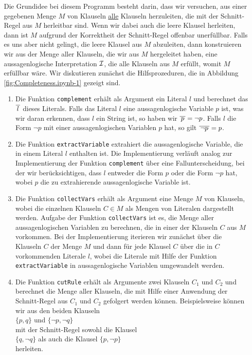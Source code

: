 Die Grundidee
bei diesem Programm besteht darin, dass wir versuchen, aus einer gegebenen Menge $M$ von Klauseln
\underline{alle} Klauseln herzuleiten, die mit der Schnitt-Regel aus $M$ herleitbar sind.  Wenn wir dabei auch
die leere Klausel herleiten, dann ist $M$ aufgrund der Korrektheit der Schnitt-Regel offenbar
unerfüllbar.  Falls es uns aber nicht gelingt, die leere Klausel aus $M$ abzuleiten, dann konstruieren wir
aus der Menge aller Klauseln, die wir aus $M$ hergeleitet haben, eine aussagenlogische Interpretation
$\mathcal{I}$, die alle Klauseln aus $M$ erfüllt, womit $M$ erfüllbar wäre.
Wir diskutieren zunächst die Hilfsprozeduren, die in Abbildung \ref{fig:Completeness.ipynb-1} gezeigt
sind. 
\begin{enumerate}
\item Die Funktion \texttt{complement} erhält als Argument ein Literal $l$ und berechnet das
       $\overline{\,l\,}$ dieses Literals.
      Falls das Literal $l$ eine aussagenlogische Variable $p$ ist, was wir daran erkennen, dass $l$ ein String
      ist, so haben wir $\overline{\,p\,} = \neg p$.
      Falls $l$ die Form $\neg p$ mit einer aussagenlogischen Variablen $p$ hat, so gilt $\overline{\,\neg p\,} =
      p$.
\item Die Funktion \texttt{extractVariable} extrahiert die aussagenlogische Variable, die in einem Literal $l$
      enthalten ist.  Die Implementierung verläuft analog zur Implementierung der Funktion
      \texttt{complement} über eine Fallunterscheidung, bei der wir berücksichtigen, dass $l$ entweder die Form
      $p$ oder die Form $\neg p$ hat, wobei $p$ die zu extrahierende aussagenlogische Variable ist.
\item Die Funktion \texttt{collectVars} erhält als Argument eine Menge $M$ von Klauseln, wobei die
      einzelnen Klauseln  \mbox{$C \!\in\! M$} als Mengen von Literalen dargestellt werden.  Aufgabe der
      Funktion \texttt{collectVars} ist es, die Menge aller aussagenlogischen Variablen zu
      berechnen, die in einer der Klauseln $C$ aus $M$ vorkommen.  Bei der Implementierung iterieren
      wir zunächst über die Klauseln $C$ der Menge $M$ und dann für jede Klausel $C$ über die in $C$
      vorkommenden Literale $l$, wobei die Literale mit Hilfe der Funktion \texttt{extractVariable} in
      aussagenlogische Variablen umgewandelt werden.
\item Die Funktion \texttt{cutRule} erhält als Argumente zwei Klauseln $C_1$ und $C_2$ und berechnet
      die Menge aller Klauseln, die mit Hilfe einer Anwendung der Schnitt-Regel aus $C_1$ und $C_2$ gefolgert werden
      können.  Beispielsweise können wir aus den beiden Klauseln
      \\[0.2cm]
      \hspace*{1.3cm}
      $\{ p, q \}$ \quad und \quad $\{ \neg p, \neg q \}$ 
      \\[0.2cm]
      mit der Schnitt-Regel sowohl die Klausel
      \\[0.2cm]
      \hspace*{1.3cm}
      $\{q, \neg q\}$ \quad als auch die Klausel \quad $\{p, \neg p \}$
      \\[0.2cm]
      herleiten.
\end{enumerate}

